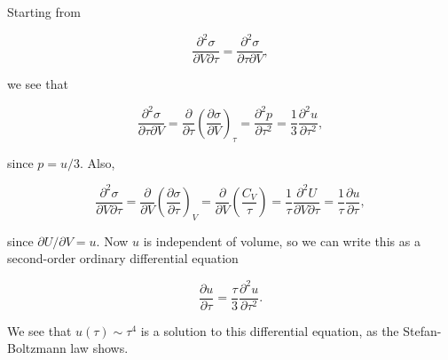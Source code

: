\documentclass{article}
\begin{document}
\begin{enumerate}
\begin{enumerate}
		Starting from

		$$\frac{\partial^2 \sigma}{\partial V \partial \tau} = \frac{\partial^2 \sigma}{\partial \tau \partial V},$$

		we see that

		$$\frac{\partial^2 \sigma}{\partial \tau \partial V} = \frac{\partial}{\partial \tau} \left( \frac{\partial \sigma}{\partial V} \right)_\tau = \frac{\partial^2 p}{\partial \tau ^2} = \frac{1}{3} \frac{\partial ^2u}{\partial \tau^2},$$

		since $p = u/3$. Also,

		$$\frac{\partial^2 \sigma}{\partial V \partial \tau} = \frac{\partial}{\partial V} \left( \frac{\partial \sigma}{\partial \tau} \right)_V = \frac{\partial}{\partial V}  \left( \frac{C_V}{\tau} \right) = \frac{1}{\tau} \frac{\partial^2 U}{\partial V \partial \tau} = \frac{1}{\tau} \frac{\partial u}{\partial \tau},$$

		since $\partial U / \partial V = u$. Now $u$ is independent of volume, so we can write this as a second-order ordinary differential equation

		$$\frac{\partial u}{\partial \tau} = \frac{\tau}{3} \frac{\partial^2 u}{\partial \tau^2}.$$

		We see that $u(\tau) \sim \tau^4$ is a solution to this differential equation, as the Stefan-Boltzmann law shows.

	\end{enumerate}

\end{enumerate}
\end{document}

